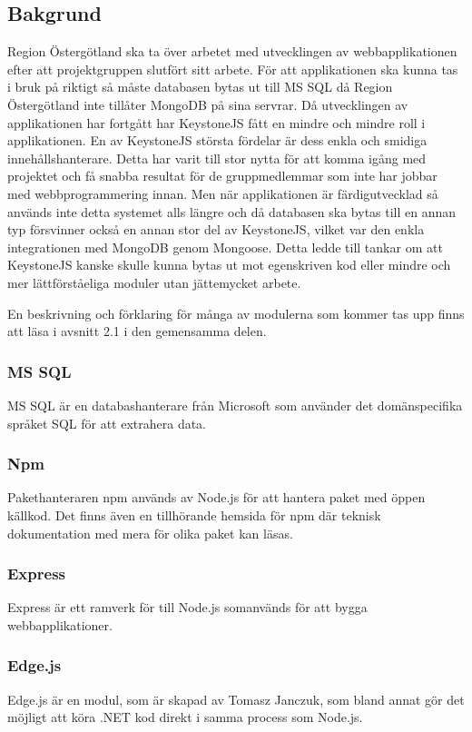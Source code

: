 \subsection{Bakgrund}
Region Östergötland ska ta över arbetet med utvecklingen av webbapplikationen efter att projektgruppen slutfört sitt arbete. För att applikationen ska kunna tas i bruk på riktigt så måste databasen bytas ut till MS SQL då Region Östergötland inte tillåter MongoDB på sina servrar. Då utvecklingen av applikationen har fortgått har KeystoneJS fått en mindre och mindre roll i applikationen. En av KeystoneJS största fördelar är dess enkla och smidiga innehållshanterare. Detta har varit till stor nytta för att komma igång med projektet och få snabba resultat för de gruppmedlemmar som inte har jobbar med webbprogrammering innan. Men när applikationen är färdigutvecklad så används inte detta systemet alls längre och då databasen ska bytas till en annan typ försvinner också en annan stor del av KeystoneJS, vilket var den enkla integrationen med MongoDB genom Mongoose. Detta ledde till tankar om att KeystoneJS kanske skulle kunna bytas ut mot egenskriven kod eller mindre och mer lättförståeliga moduler utan jättemycket arbete.

En beskrivning och förklaring för många av modulerna som kommer tas upp finns att läsa i avsnitt 2.1 i den gemensamma delen.
\subsubsection{MS SQL}
MS SQL är en databashanterare från Microsoft som använder det domänspecifika språket SQL för att extrahera data.

\subsubsection{Npm}
Pakethanteraren npm används av Node.js för att hantera paket med öppen källkod. Det finns även en tillhörande hemsida för npm där teknisk dokumentation med mera för olika paket kan läsas. 

\subsubsection{Express}
Express är ett ramverk för till Node.js somanvänds för att bygga webbapplikationer.

\subsubsection{Edge.js}
Edge.js är en modul, som är skapad av Tomasz Janczuk, som bland annat gör det möjligt att köra .NET kod direkt i samma process som Node.js. 

